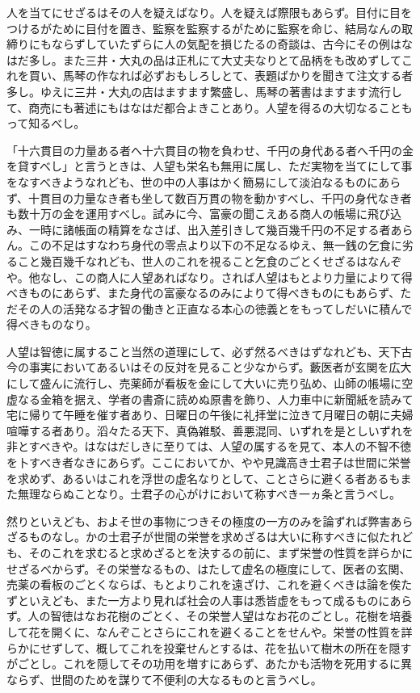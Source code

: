 \documentclass[a4paper, platex, dvipdfmx]{jsarticle}
\begin{document}
人を当てにせざるはその人を疑えばなり。人を疑えば際限もあらず。目付に目をつけるがために目付を置き、監察を監察するがために監察を命じ、結局なんの取締りにもならずしていたずらに人の気配を損じたるの奇談は、古今にその例はなはだ多し。また三井・大丸の品は正札にて大丈夫なりとて品柄をも改めずしてこれを買い、馬琴の作なれば必ずおもしろしとて、表題ばかりを聞きて注文する者多し。ゆえに三井・大丸の店はますます繁盛し、馬琴の著書はますます流行して、商売にも著述にもはなはだ都合よきことあり。人望を得るの大切なることもって知るべし。

「十六貫目の力量ある者へ十六貫目の物を負わせ、千円の身代ある者へ千円の金を貸すべし」と言うときは、人望も栄名も無用に属し、ただ実物を当てにして事をなすべきようなれども、世の中の人事はかく簡易にして淡泊なるものにあらず、十貫目の力量なき者も坐して数百万貫の物を動かすべし、千円の身代なき者も数十万の金を運用すべし。試みに今、富豪の聞こえある商人の帳場に飛び込み、一時に諸帳面の精算をなさば、出入差引きして幾百幾千円の不足する者あらん。この不足はすなわち身代の零点より以下の不足なるゆえ、無一銭の乞食に劣ること幾百幾千なれども、世人のこれを視ること乞食のごとくせざるはなんぞや。他なし、この商人に人望あればなり。されば人望はもとより力量によりて得べきものにあらず、また身代の富豪なるのみによりて得べきものにもあらず、ただその人の活発なる才智の働きと正直なる本心の徳義とをもってしだいに積んで得べきものなり。

人望は智徳に属すること当然の道理にして、必ず然るべきはずなれども、天下古今の事実においてあるいはその反対を見ること少なからず。藪医者が玄関を広大にして盛んに流行し、売薬師が看板を金にして大いに売り弘め、山師の帳場に空虚なる金箱を据え、学者の書斎に読めぬ原書を飾り、人力車中に新聞紙を読みて宅に帰りて午睡を催す者あり、日曜日の午後に礼拝堂に泣きて月曜日の朝に夫婦喧嘩する者あり。滔々たる天下、真偽雑駁、善悪混同、いずれを是としいずれを非とすべきや。はなはだしきに至りては、人望の属するを見て、本人の不智不徳を卜すべき者なきにあらず。ここにおいてか、やや見識高き士君子は世間に栄誉を求めず、あるいはこれを浮世の虚名なりとして、ことさらに避くる者あるもまた無理ならぬことなり。士君子の心がけにおいて称すべき一ヵ条と言うべし。

然りといえども、およそ世の事物につきその極度の一方のみを論ずれば弊害あらざるものなし。かの士君子が世間の栄誉を求めざるは大いに称すべきに似たれども、そのこれを求むると求めざるとを決するの前に、まず栄誉の性質を詳らかにせざるべからず。その栄誉なるもの、はたして虚名の極度にして、医者の玄関、売薬の看板のごとくならば、もとよりこれを遠ざけ、これを避くべきは論を俟たずといえども、また一方より見れば社会の人事は悉皆虚をもって成るものにあらず。人の智徳はなお花樹のごとく、その栄誉人望はなお花のごとし。花樹を培養して花を開くに、なんぞことさらにこれを避くることをせんや。栄誉の性質を詳らかにせずして、概してこれを投棄せんとするは、花を払いて樹木の所在を隠すがごとし。これを隠してその功用を増すにあらず、あたかも活物を死用するに異ならず、世間のためを謀りて不便利の大なるものと言うべし。
\end{document}
